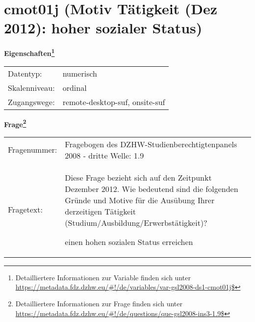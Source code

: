 
    \setcounter{footnote}{0}

    \vspace*{-1.8cm}
	\section{cmot01j (Motiv Tätigkeit (Dez 2012): hoher sozialer Status)}
	\label{section:cmot01j}



    \vspace*{0.5cm}
    \noindent\textbf{Eigenschaften\footnote{Detailliertere Informationen zur Variable finden sich unter
		\url{https://metadata.fdz.dzhw.eu/\#!/de/variables/var-gsl2008-ds1-cmot01j$}}}\\
	\begin{tabularx}{\hsize}{@{}lX}
	Datentyp: & numerisch \\
	Skalenniveau: & ordinal \\
	Zugangswege: &
	  remote-desktop-suf, 
	  onsite-suf
 \\
    \end{tabularx}



				\vspace*{0.5cm}
                \noindent\textbf{Frage\footnote{Detailliertere Informationen zur Frage finden sich unter
		              \url{https://metadata.fdz.dzhw.eu/\#!/de/questions/que-gsl2008-ins3-1.9$}}}\\
				\begin{tabularx}{\hsize}{@{}lX}
					Fragenummer: &
					  Fragebogen des DZHW-Studienberechtigtenpanels 2008 - dritte Welle:
					  1.9
 \\
					Fragetext: & Diese Frage bezieht sich auf den Zeitpunkt Dezember 2012. Wie bedeutend sind die folgenden Gründe und Motive für die Ausübung Ihrer derzeitigen Tätigkeit (Studium/Ausbildung/Erwerbstätigkeit)?\par  einen hohen sozialen Status erreichen \\
				\end{tabularx}





